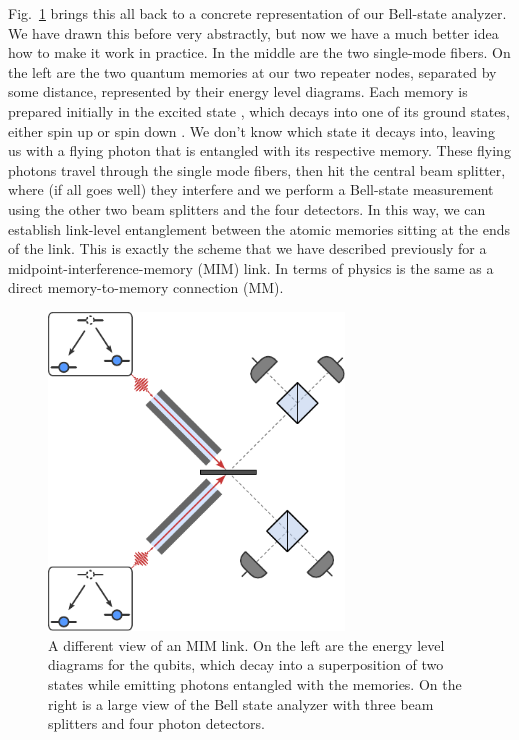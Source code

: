 Fig.~\ref{fig:13-MIM-energy} brings this all back to a concrete representation of our Bell-state analyzer. We have drawn this before very abstractly, but now we have a much better idea how to make it work in practice. In the middle are the two single-mode fibers. On the left are the two quantum memories at our two repeater nodes, separated by some distance, represented by their energy level diagrams. Each memory is prepared initially in the excited state , which decays into one of its ground states, either spin up \ket{\uparrow} or spin down \ket{\downarrow}. We don't know which state it decays into, leaving us with a flying photon that is entangled with its respective memory. These flying photons travel through the single mode fibers, then hit the central beam splitter, where (if all goes well) they interfere and we perform a Bell-state measurement using the other two beam splitters and the four detectors. In this way, we can establish link-level entanglement between the atomic memories sitting at the ends of the link. This is exactly the scheme that we have described previously for a midpoint-interference-memory (MIM) link. In terms of physics is the same as a direct memory-to-memory connection (MM).

\begin{figure}[t]
    \centering
    \includegraphics[width=0.7\textwidth]{lesson13/13-4_MIM_with_energy_levels.pdf}
    \caption[MIM with energy levels]{A different view of an MIM link. On the left are the energy level diagrams for the qubits, which decay into a superposition of two states while emitting photons entangled with the memories. On the right is a large view of the Bell state analyzer with three beam splitters and four photon detectors.}
    \label{fig:13-MIM-energy}
\end{figure}




